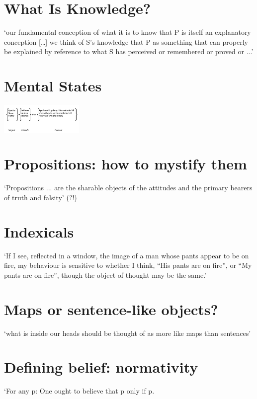 \documentclass[11pt]{extarticle}
\begin{document}
\begin{multicols}{3}
\section{What Is Knowledge?}
‘our fundamental conception of what it is to know that P is itself an explanatory conception […] we think of S’s knowledge that P as something that can properly be explained by reference to what S has perceived or remembered or proved or ...’\citep{Cassam:2007ri} %


\section{Mental States}
\begin{center}
  \includegraphics[width=0.3\textwidth]{fig4n.png}
\end{center}


\section{Propositions: how to mystify them}
‘Propositions ... are the sharable objects of the attitudes and the primary bearers of truth and falsity’\citep{McGrath:2012pro} (?!)

\section{Indexicals}
`If I see, reflected in a window, the image of a man whose pants appear to be on fire, my behaviour is sensitive to whether I think, ``His pants are on fire'', or ``My pants are on fire'', though the object of thought may be the same.'\citep{Kaplan:1990xa} %

\section{Maps or sentence-like objects?}
`what is inside our heads should be thought of as more like maps than sentences'\citep{Braddon-Mitchell:1996ce} %

\section{Defining belief: normativity}
‘For any p: One ought to believe that p only if p.


\end{multicols}
\end{document}
